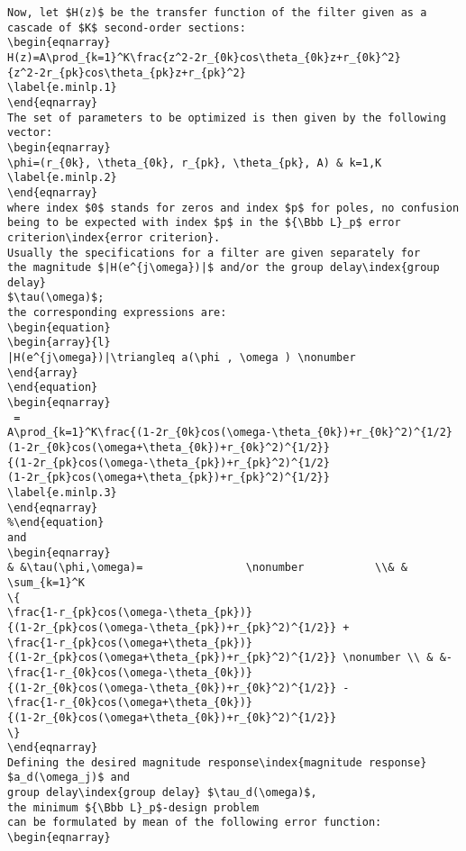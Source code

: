 {\begin{verbatim}
Now, let $H(z)$ be the transfer function of the filter given as a 
cascade of $K$ second-order sections:
\begin{eqnarray}
H(z)=A\prod_{k=1}^K\frac{z^2-2r_{0k}cos\theta_{0k}z+r_{0k}^2}
{z^2-2r_{pk}cos\theta_{pk}z+r_{pk}^2}
\label{e.minlp.1}
\end{eqnarray}
The set of parameters to be optimized is then given by the following 
vector: 
\begin{eqnarray}
\phi=(r_{0k}, \theta_{0k}, r_{pk}, \theta_{pk}, A) & k=1,K
\label{e.minlp.2}
\end{eqnarray}
where index $0$ stands for zeros and index $p$ for poles, no confusion 
being to be expected with index $p$ in the ${\Bbb L}_p$ error criterion\index{error criterion}. 
Usually the specifications for a filter are given separately for 
the magnitude $|H(e^{j\omega})|$ and/or the group delay\index{group delay}  
$\tau(\omega)$; 
the corresponding expressions are:
\begin{equation}
\begin{array}{l}
|H(e^{j\omega})|\triangleq a(\phi , \omega ) \nonumber 
\end{array}
\end{equation}
\begin{eqnarray}
 = 
A\prod_{k=1}^K\frac{(1-2r_{0k}cos(\omega-\theta_{0k})+r_{0k}^2)^{1/2} 
(1-2r_{0k}cos(\omega+\theta_{0k})+r_{0k}^2)^{1/2}}
{(1-2r_{pk}cos(\omega-\theta_{pk})+r_{pk}^2)^{1/2} 
(1-2r_{pk}cos(\omega+\theta_{pk})+r_{pk}^2)^{1/2}}
\label{e.minlp.3}
\end{eqnarray}
%\end{equation}
and
\begin{eqnarray}
& &\tau(\phi,\omega)=                \nonumber           \\& & \sum_{k=1}^K
\{
\frac{1-r_{pk}cos(\omega-\theta_{pk})}
{(1-2r_{pk}cos(\omega-\theta_{pk})+r_{pk}^2)^{1/2}} + 
\frac{1-r_{pk}cos(\omega+\theta_{pk})}
{(1-2r_{pk}cos(\omega+\theta_{pk})+r_{pk}^2)^{1/2}} \nonumber \\ & &-  
\frac{1-r_{0k}cos(\omega-\theta_{0k})}
{(1-2r_{0k}cos(\omega-\theta_{0k})+r_{0k}^2)^{1/2}} - 
\frac{1-r_{0k}cos(\omega+\theta_{0k})}
{(1-2r_{0k}cos(\omega+\theta_{0k})+r_{0k}^2)^{1/2}}
\}
\end{eqnarray}
Defining the desired magnitude response\index{magnitude response} 
$a_d(\omega_j)$ and 
group delay\index{group delay} $\tau_d(\omega)$, 
the minimum ${\Bbb L}_p$-design problem 
can be formulated by mean of the following error function: 
\begin{eqnarray}

\end{verbatim}}
